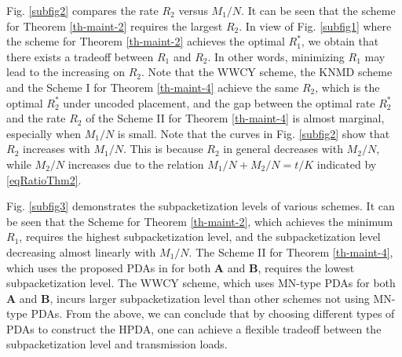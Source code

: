 \documentclass[onecolumn,10pt]{IEEEtran}
\theoremstyle{mythm}
\begin{document}
Fig. \ref{subfig2} compares the rate $R_2$ versus ${M_1}/{N}$. It can be seen that the scheme for Theorem \ref{th-maint-2} requires the largest  $R_2$. In view of  Fig. \ref{subfig1} where  the scheme for Theorem \ref{th-maint-2} achieves the optimal $R^*_1$, we obtain that there exists a tradeoff between $R_1$ and $R_2$. In other words, minimizing  $R_1$ may lead to the increasing on $R_2$.  Note that the WWCY scheme, the KNMD scheme and the Scheme I for Theorem \ref{th-maint-4} achieve the same $R_2$, which is the   optimal $R^*_2$ under uncoded placement,  and the gap between the optimal rate $R^*_2$ and the rate $R_2$ of the Scheme II for Theorem \ref{th-maint-4} is almost marginal, especially when $M_1/N$ is small.  Note that the curves in Fig.  \ref{subfig2}   show  that $R_2$ increases with   ${M_1}/{N}$. This is because $R_2$ in general decreases with ${M_2}/{N}$, while ${M_2}/{N}$ increases due to   the relation $M_1/N+M_2/N=t/K$ indicated by  \eqref{eqRatioThm2}. %

Fig. \ref{subfig3} demonstrates the subpacketization levels of various schemes. It can be seen that the Scheme for Theorem  \ref{th-maint-2}, which achieves the minimum $R_1$, requires the highest subpacketization level, and the subpacketization level decreasing almost linearly with $M_1/N$. The Scheme II for Theorem \ref{th-maint-4}, which uses the proposed PDAs in \cite{YCTC} for both $\mathbf{A}$ and $\mathbf{B}$, requires the lowest subpacketization level. The WWCY scheme, which uses MN-type PDAs for  both $\mathbf{A}$ and $\mathbf{B}$, incurs larger subpacketization level than other schemes not using MN-type PDAs. From the above, we can conclude that by choosing different types of PDAs to construct the HPDA, one can achieve a flexible tradeoff between  the subpacketization level and transmission loads.
\end{document}
